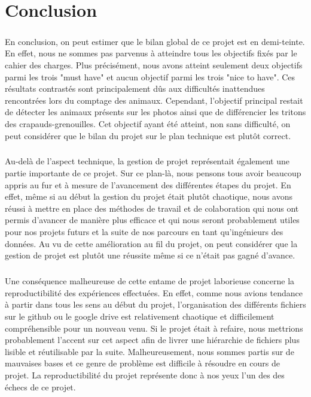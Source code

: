 \chapter{Conclusion}

\paragraph{} En conclusion, on peut estimer que le bilan global de ce projet est en demi-teinte. En effet, nous ne sommes pas parvenus à atteindre tous les objectifs fixés par le cahier des charges. Plus précisément, nous avons atteint seulement deux objectifs parmi les trois "must have" et aucun objectif parmi les trois "nice to have". Ces résultats contrastés sont principalement dûs aux difficultés inattendues rencontrées lors du comptage des animaux. Cependant, l'objectif principal restait de détecter les animaux présents sur les photos ainsi que de différencier les tritons des crapauds-grenouilles. Cet objectif ayant été atteint, non sans difficulté, on peut considérer que le bilan du projet sur le plan technique est plutôt correct.

\paragraph{} Au-delà de l'aspect technique, la gestion de projet représentait également une partie importante de ce projet. Sur ce plan-là, nous pensons tous avoir beaucoup appris au fur et à mesure de l'avancement des différentes étapes du projet. En effet, même si au début la gestion du projet était plutôt chaotique, nous avons réussi à mettre en place des méthodes de travail et de colaboration qui nous ont permis d'avancer de manière plus efficace et qui nous seront probablement utiles pour nos projets futurs et la suite de nos parcours en tant qu'ingénieurs des données. Au vu de cette amélioration au fil du projet, on peut considérer que la gestion de projet est plutôt une réussite même si ce n'était pas gagné d'avance.

\paragraph{} Une conséquence malheureuse de cette entame de projet laborieuse concerne la reproductibilité des expériences effectuées. En effet, comme nous avions tendance à partir dans tous les sens au début du projet, l'organisation des différents fichiers sur le github ou le google drive est relativement chaotique et difficilement compréhensible pour un nouveau venu. Si le projet était à refaire, nous mettrions probablement l'accent sur cet aspect afin de livrer une hiérarchie de fichiers plus lisible et réutilisable par la suite. Malheureusement, nous sommes partis sur de mauvaises bases et ce genre de problème est difficile à résoudre en cours de projet. La reproductibilité du projet représente donc à nos yeux l'un des des échecs de ce projet.


